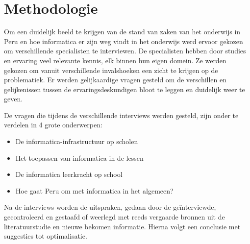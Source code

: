 
\chapter{Methodologie}
\label{ch:methodologie}


Om een duidelijk beeld te krijgen van de stand van zaken van het onderwijs in Peru en hoe informatica er zijn weg vindt in het onderwijs werd ervoor gekozen om verschillende specialisten te interviewen. De specialisten hebben door studies en ervaring veel relevante kennis, elk binnen hun eigen domein. Ze werden gekozen om vanuit verschillende invalshoeken een zicht te krijgen op de problematiek. Er werden gelijkaardige vragen gesteld om de verschillen en gelijkenissen tussen de ervaringsdeskundigen bloot te leggen en duidelijk weer te geven.

De vragen die tijdens de verschillende interviews werden gesteld, zijn onder te verdelen in 4 grote onderwerpen: 

\begin{itemize}
	\item De informatica-infrastructuur op scholen
	\item Het toepassen van informatica in de lessen
	\item De informatica leerkracht op school
	\item Hoe gaat Peru om met informatica in het algemeen?
\end{itemize}

Na de interviews worden de uitspraken, gedaan door de geïnterviewde, gecontroleerd en gestaafd of weerlegd met reeds vergaarde bronnen uit de literatuurstudie en nieuwe bekomen informatie. Hierna volgt een conclusie met suggesties tot optimalisatie.

